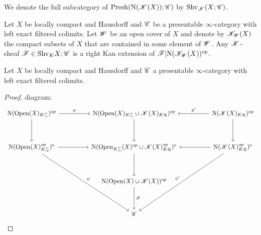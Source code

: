 \documentclass[../thesis.tex]{subfiles}
\begin{document}
\begin{definition}
    We denote the full subcategory of $\mathrm{Presh}(\mathrm{N}(\mathscr{K}(X)); \mathscr{C})$ by $\mathrm{Shv}_{\mathscr{K}}(X;\mathscr{C})$.
\end{definition}
\begin{lemma}
    Let $X$ be locally compact and Hausdorff and $\mathscr{C}$ be a presentable $\infty$-category with left exact filtered colimits.
    Let $\mathscr{W}$ be an open cover of $X$ and denote by $\mathscr{K}_{\mathscr{W}}(X)$ the compact subsets of $X$ that are contained in some element of $\mathscr{W}$.
    Any $\mathscr{K}$-sheaf $\mathscr{F}\in \mathrm{Shv}_K{X;\mathscr{C}}$ is a right Kan extension of $\mathscr{F}|\mathrm{N}(\mathscr{K}_{\mathscr{W}}(X))^{op}$.
\end{lemma}
\begin{theorem}
    Let $X$ be locally compact and Hausdorff and $\mathscr{C}$ a presentable $\infty$-category with left exact filtered colimits.

\end{theorem}
\begin{proof}
    diagram:
    \[\begin{tikzcd}
            {\Nerve(\Open(X)_{K\subseteq})^{op}} && {\Nerve(\Open(X)_{K\subseteq}\cup \K(X)_{K\Subset})^{op}} && {\Nerve(\K(X)_{K\Subset})^{op}} \\
            \\
            {\Nerve(\Open(X)_{K\subseteq}^{op})^{\triangleright}} && {\Nerve(\Open_{K\subseteq}(X)^{op}\cup \K(X)_{K\Subset}^{op})^{\triangleright}} && {\Nerve(\K(X)_{K\Subset}^{op})^{\triangleright}} \\
            \\
            && {\Nerve(\Open(X)\cup \K(X))^{op}} \\
            \\
            && \C
            \arrow["p", from=1-1, to=1-3]
            \arrow["{p'}"', from=1-5, to=1-3]
            \arrow[from=1-1, to=3-1]
            \arrow[from=3-1, to=3-3]
            \arrow[from=3-5, to=3-3]
            \arrow[from=1-3, to=3-3]
            \arrow[from=3-3, to=5-3]
            \arrow["\F", from=5-3, to=7-3]
            \arrow["{\psi'}"', from=3-5, to=7-3]
            \arrow["\psi", from=3-1, to=7-3]
            \arrow[from=1-5, to=3-5]
        \end{tikzcd}\]
\end{proof}
\end{document}
